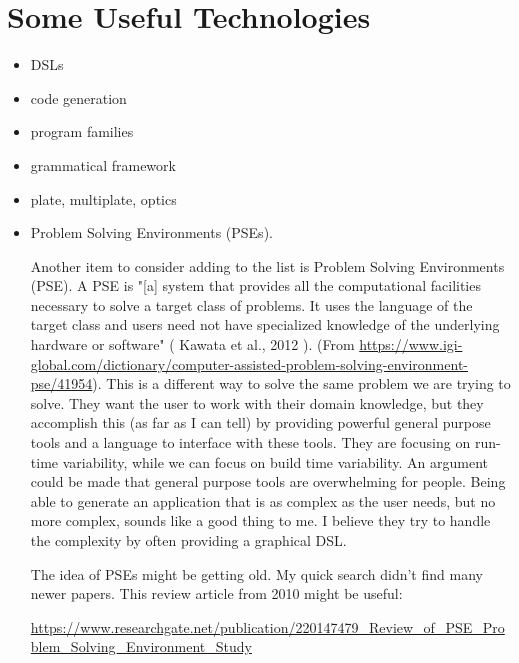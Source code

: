 \documentclass[10pt,twoside,onecolumn,openany,letterpaper]{memoir}
\begin{document}
\chapter{Some Useful Technologies}\label{ch:techniques}


\begin{itemize}
\item DSLs
\item code generation
\item program families
\item grammatical framework
\item plate, multiplate, optics
\item Problem Solving Environments (PSEs).

Another item to consider adding to the list is Problem Solving Environments
(PSE). A PSE is "[a] system that provides all the computational facilities
necessary to solve a target class of problems. It uses the language of the
target class and users need not have specialized knowledge of the underlying
hardware or software" ( Kawata et al., 2012 ). 
(From
\url{https://www.igi-global.com/dictionary/computer-assisted-problem-solving-environment-pse/41954}).
This is a different way to solve the same problem we are trying to solve. They
want the user to work with their domain knowledge, but they accomplish this (as
far as I can tell) by providing powerful general purpose tools and a language
to interface with these tools. They are focusing on run-time variability, while
we can focus on build time variability. An argument could be made that general
purpose tools are overwhelming for people. Being able to generate an
application that is as complex as the user needs, but no more complex, sounds
like a good thing to me. I believe they try to handle the complexity by
often providing a graphical DSL.

The idea of PSEs might be getting old. My quick search didn't find many newer
papers. This review article from 2010 might be useful:

\url{https://www.researchgate.net/publication/220147479_Review_of_PSE_Problem_Solving_Environment_Study}
  
\end{itemize}
\end{document}
